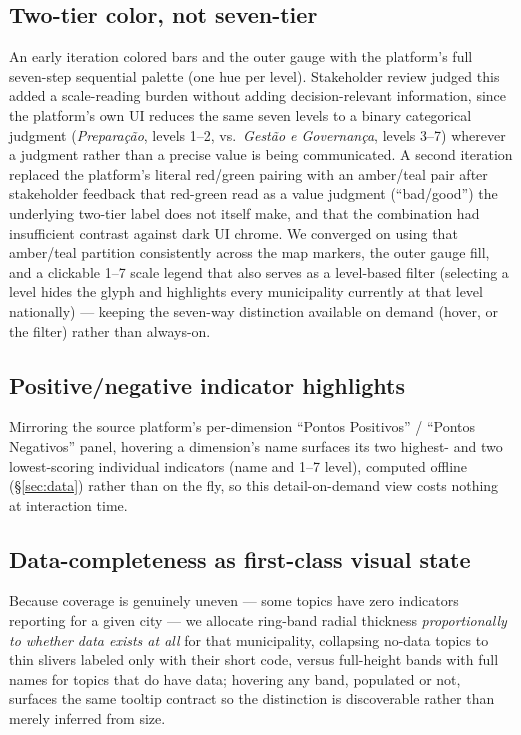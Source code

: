 \documentclass[10pt,twocolumn]{article}
\begin{document}
\subsection{Two-tier color, not seven-tier}
An early iteration colored bars and the outer gauge with the platform's full seven-step sequential palette (one hue per level). Stakeholder review judged this added a scale-reading burden without adding decision-relevant information, since the platform's own UI reduces the same seven levels to a binary categorical judgment (\emph{Prepara\c{c}\~ao}, levels 1--2, vs.\ \emph{Gest\~ao e Governan\c{c}a}, levels 3--7) wherever a judgment rather than a precise value is being communicated. A second iteration replaced the platform's literal red/green pairing with an amber/teal pair after stakeholder feedback that red-green read as a value judgment (``bad/good'') the underlying two-tier label does not itself make, and that the combination had insufficient contrast against dark UI chrome. We converged on using that amber/teal partition consistently across the map markers, the outer gauge fill, and a clickable 1--7 scale legend that also serves as a level-based filter (selecting a level hides the glyph and highlights every municipality currently at that level nationally) — keeping the seven-way distinction available on demand (hover, or the filter) rather than always-on.

\subsection{Positive/negative indicator highlights}
\label{sec:positives}
Mirroring the source platform's per-dimension ``Pontos Positivos'' / ``Pontos Negativos'' panel, hovering a dimension's name surfaces its two highest- and two lowest-scoring individual indicators (name and 1--7 level), computed offline (\S\ref{sec:data}) rather than on the fly, so this detail-on-demand view costs nothing at interaction time.

\subsection{Data-completeness as first-class visual state}
Because coverage is genuinely uneven — some topics have zero indicators reporting for a given city — we allocate ring-band radial thickness \emph{proportionally to whether data exists at all} for that municipality, collapsing no-data topics to thin slivers labeled only with their short code, versus full-height bands with full names for topics that do have data; hovering any band, populated or not, surfaces the same tooltip contract so the distinction is discoverable rather than merely inferred from size.
\end{document}
